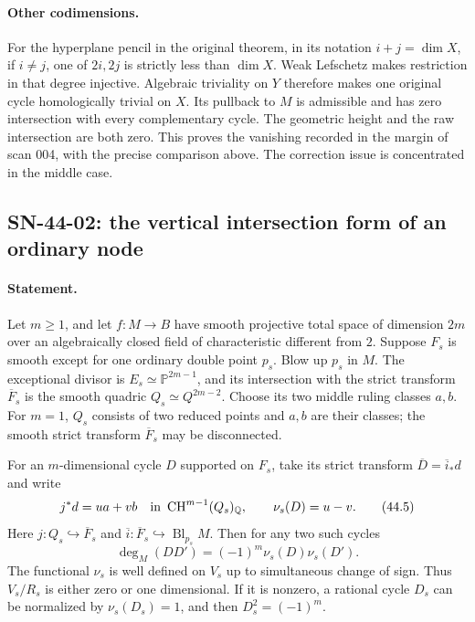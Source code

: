 \documentclass[11pt,a4paper]{article}
\theoremstyle{definition}
\theoremstyle{remark}
\begin{document}
\paragraph{Other codimensions.}
For the hyperplane pencil in the original theorem, in its notation
$i+j=\dim X$, if $i\ne j$, one of $2i,2j$
is strictly less than $\dim X$.  Weak Lefschetz makes restriction in
that degree injective.  Algebraic triviality on $Y$ therefore makes
one original cycle homologically trivial on $X$.  Its pullback to
$M$ is admissible and has zero intersection with every complementary
cycle.  The geometric height and the raw intersection are both zero.
This proves the vanishing recorded in the margin of scan 004, with
the precise comparison above.  The correction issue is concentrated
in the middle case.

\subsection{SN-44-02: the vertical intersection form of an ordinary node}
\label{sn:44-02}

\paragraph{Statement.}
Let $m\ge1$, and let $f:M\to B$ have smooth projective total space of dimension
$2m$ over an algebraically closed field of characteristic different
from $2$.  Suppose $F_s$ is smooth except for one ordinary double
point $p_s$.  Blow up $p_s$ in $M$.  The exceptional divisor is
$E_s\simeq\mathbb P^{2m-1}$, and its intersection with the strict
transform $\overline F_s$ is the smooth quadric
$Q_s\simeq Q^{2m-2}$.  Choose its two middle ruling classes $a,b$.
For $m=1$, $Q_s$ consists of two reduced points and $a,b$ are their
classes; the smooth strict transform $\overline F_s$ may be disconnected.

For an $m$-dimensional cycle $D$ supported on $F_s$, take its strict
transform $\overline D=\overline i_*d$ and write
\[
 j^*d=u a+v b\quad\hbox{in }\operatorname{CH}^{m-1}(Q_s)_{\mathbb Q},
 \qquad \nu_s(D)=u-v.                                      \tag{44.5}
\]
Here $j:Q_s\hookrightarrow\overline F_s$ and
$\overline i:\overline F_s\hookrightarrow\operatorname{Bl}_{p_s}M$.
Then for any two such cycles
\[
 \boxed{\quad\deg_M(DD')=(-1)^m\nu_s(D)\nu_s(D').\quad}       \tag{44.6}
 \label{eq:44-node-form}
\]
The functional $\nu_s$ is well defined on $V_s$ up to simultaneous
change of sign.  Thus $V_s/R_s$ is either zero or one dimensional.
If it is nonzero, a rational cycle $D_s$ can be normalized by
$\nu_s(D_s)=1$, and then $D_s^2=(-1)^m$.
\end{document}
